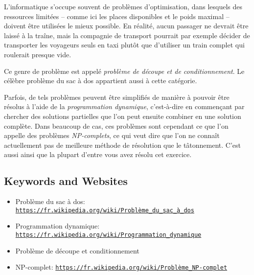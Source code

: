 \documentclass[a4paper,11pt]{report}
\newcommand{\BrochureUrlText}[1]{\texttt{#1}}
\begin{document}
L’informatique s’occupe souvent de problèmes d’optimisation, dans lesquels des ressources limitées – comme ici les places disponibles et le poids maximal – doivent être utilisées le mieux possible. En réalité, aucun passager ne devrait être laissé à la traîne, mais la compagnie de transport pourrait par exemple décider de transporter les voyageurs seuls en taxi plutôt que d’utiliser un train complet qui roulerait presque vide.

Ce genre de problème est appelé \emph{problème de découpe et de conditionnement}. Le célèbre problème du sac à dos appartient aussi à cette catégorie.

Parfois, de tels problèmes peuvent être simplifiés de manière à pouvoir être résolus à l’aide de la \emph{programmation dynamique}, c’est-à-dire en commençant par chercher des solutions partielles que l’on peut ensuite combiner en une solution complète. Dans beaucoup de cas, ces problèmes sont cependant ce que l’on appelle des problèmes \emph{NP-complets}, ce qui veut dire que l’on ne connaît actuellement pas de meilleure méthode de résolution que le tâtonnement. C’est aussi ainsi que la plupart d’entre vous avez résolu cet exercice.

{\raggedright

\subsection*{Keywords and Websites}

\begin{itemize}
  \item Problème du sac à dos: \href{https://fr.wikipedia.org/wiki/Probl\%C3\%A8me_du_sac_\%C3\%A0_dos}{\BrochureUrlText{https://fr.wikipedia.org/wiki/Problème\_du\_sac\_à\_dos}}
  \item Programmation dynamique: \href{https://fr.wikipedia.org/wiki/Programmation_dynamique}{\BrochureUrlText{https://fr.wikipedia.org/wiki/Programmation\_dynamique}}
  \item Problème de découpe et conditionnement
  \item NP-complet: \href{https://fr.wikipedia.org/wiki/Probl\%C3\%A8me_NP-complet}{\BrochureUrlText{https://fr.wikipedia.org/wiki/Problème\_NP-complet}}
\end{itemize}


}
\end{document}

